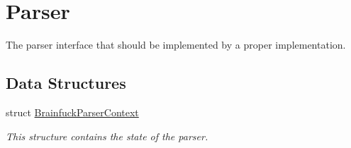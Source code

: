 \hypertarget{group__parser}{}\section{Parser}
\label{group__parser}


The parser interface that should be implemented by a proper implementation.  


\subsection*{Data Structures}
\begin{DoxyCompactItemize}
\item 
struct \hyperlink{structBrainfuckParserContext}{Brainfuck\+Parser\+Context}
\begin{DoxyCompactList}\small\item\em This structure contains the state of the parser. \end{DoxyCompactList}\end{DoxyCompactItemize}
